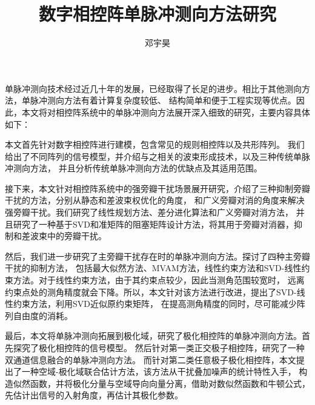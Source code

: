 \documentclass[master]{thesis-uestc}
\title{数字相控阵单脉冲测向方法研究}{The Research on Monopulse estimation for 
Digital Phased Array}
\author{邓宇昊}{Yuhao Deng}
\begin{document}
\makecover
\originalitydeclaration

\begin{chineseabstract}
单脉冲测向技术经过近几十年的发展，已经取得了长足的进步。相比于其他测向方法，单脉冲测向方法有着计算复杂度较低、
结构简单和便于工程实现等优点。因此，本文将对相控阵系统中的单脉冲测向方法展开深入细致的研究，主要内容具体如下：

本文首先针对数字相控阵进行建模，包含常见的规则相控阵以及共形阵列。
我们给出了不同阵列的信号模型，并介绍与之相关的波束形成技术，以及三种传统单脉冲测向方法，
并且分析传统单脉冲测向方法的优缺点及其适用范围。

接下来，本文针对相控阵系统中的强旁瓣干扰场景展开研究，介绍了三种抑制旁瓣干扰的方法，分别从静态和差波束权优化的角度，
和广义旁瓣对消的角度来解决强旁瓣干扰。我们研究了线性规划方法、差分进化算法和广义旁瓣对消方法，
并且研究了一种基于SVD和准矩阵的阻塞矩阵设计方法，将其用于旁瓣对消器，抑制和差波束中的旁瓣干扰。

然后，我们进一步研究了主旁瓣干扰存在时的单脉冲测向方法。探讨了四种主旁瓣干扰的抑制方法，
包括最大似然方法、MVAM方法，线性约束方法和SVD-线性约束方法。对于线性约束方法，由于其约束点较少，因此当测角范围较宽时，
远离约束点处的测角精度就会下降。所以，本文针对该方法进行改进，提出了SVD-线性约束方法，利用SVD近似原约束矩阵，
在提高测角精度的同时，尽可能减少阵列自由度的消耗。

最后，本文将单脉冲测向拓展到极化域，研究了极化相控阵的单脉冲测向方法。首先探究了极化相控阵的信号模型。
然后针对第一类正交极子相控阵，研究了一种双通道信息融合的单脉冲测向方法。
而针对第二类任意极子极化相控阵，本文提出了一种空域-极化域联合估计方法，该方法从干扰叠加噪声的统计特性入手，
构造似然函数，并将极化分量与空域导向向量分离，借助对数似然函数和牛顿公式，先估计出信号的入射角度，再估计其极化参数。

\end{chineseabstract}
\end{document}
